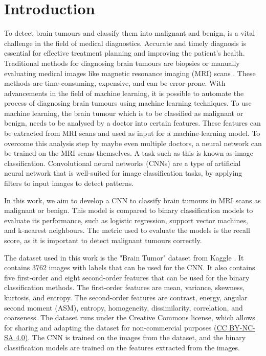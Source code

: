 \chapter{Introduction}
\label{cha:introduction}

To detect brain tumours and classify them into malignant and benign, is a vital challenge in the field of medical diagnostics. 
Accurate and timely diagnosis is essential for effective treatment planning and improving the patient's health.
Traditional methods for diagnosing brain tumours are biopsies or manually evaluating medical images like magnetic resonance imaging (MRI) scans \cite{CancerResearUK}.
These methods are time-consuming, expensive, and can be error-prone. 
With advancements in the field of machine learning, it is possible to automate the process of diagnosing brain tumours using machine learning techniques. %
To use machine learning, the brain tumour which is to be classified as malignant or benign, needs to be analysed by a doctor into certain features.
These features can be extracted from MRI scans and used as input for a machine-learning model.
To overcome this analysis step by maybe even multiple doctors, a neural network can be trained on the MRI scans themselves.
A task such as this is known as image classification.
Convolutional neural networks (CNNs) are a type of artificial neural network that is well-suited for image classification tasks, by applying filters to input images to detect patterns.

In this work, we aim to develop a CNN to classify brain tumours in MRI scans as malignant or benign.
This model is compared to binary classification models to evaluate its performance, such as logistic regression, support vector machines, and k-nearest neighbours.
The metric used to evaluate the models is the recall score, as it is important to detect malignant tumours correctly.

The dataset used in this work is the "Brain Tumor" dataset from Kaggle \cite{jakesh_bohaju_2020}.
It contains 3762 images with labels that can be used for the CNN.
It also contains five first-order and eight second-order features that can be used for the binary classification methods.
The first-order features are mean, variance, skewness, kurtosis, and entropy.
The second-order features are contrast, energy, angular second moment (ASM), entropy, homogeneity, dissimilarity, correlation, and coarseness.
The dataset runs under the Creative Commons license, which allows for sharing and adapting the dataset for non-commercial purposes \href{https://creativecommons.org/licenses/by-nc-sa/4.0/}{(CC BY-NC-SA 4.0)}. 
The CNN is trained on the images from the dataset, and the binary classification models are trained on the features extracted from the images.

